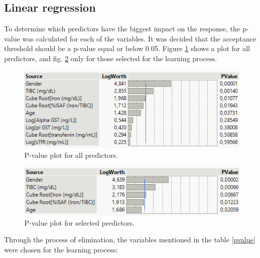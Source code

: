 \subsection{Linear regression}

To determine which predictors have the biggest impact on the response, the p-value was calculated for each of the variables. It was decided that the acceptance threshold should be a p-value equal or below 0.05. Figure \ref{fig:pvalue3} shows a plot for all predictors, and fig. \ref{fig:pvalue4} only for those selected for the learning process.

\begin{figure}[!ht]
	\centering
	\includegraphics[width=0.6\linewidth]{Rozdzial3/pvalue3}
	\caption{P-value plot for all predictors.}
	\label{fig:pvalue3}
\end{figure}

\begin{figure}[!ht]
	\centering
	\includegraphics[width=0.7\linewidth]{Rozdzial3/pvalue4}
	\caption{P-value plot for selected predictors.}
	\label{fig:pvalue4}
\end{figure}

Through the process of elimination, the variables mentioned in the table \ref{pvalue} were chosen for the learning process:

